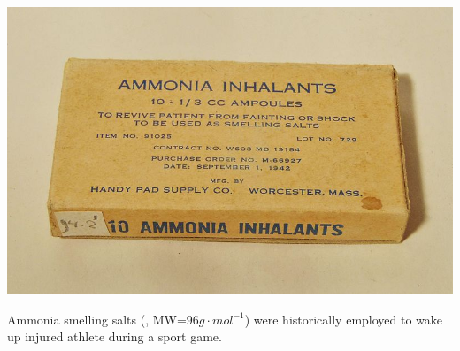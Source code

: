 \documentclass[main.tex]{subfiles}
\begin{document}
\begin{marginfigure}[2cm]%
      \includegraphics{chapter7/figure7}
      \label{fig:marginfig}
      \caption{Ammonia smelling salts (, MW=$96g\cdot mol^{-1}$) were historically employed to wake up injured athlete during a sport game. }
	\end{marginfigure}%
\end{document}

